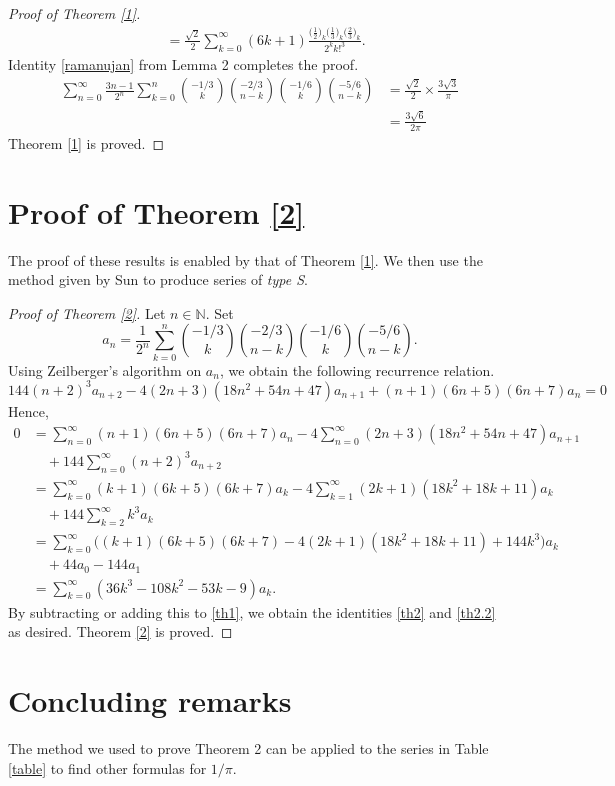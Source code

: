 \documentclass{amsart}
\numberwithin{equation}{section}
\newcommand{\N}{\mathbb N}
\begin{document}
\begin{proof}[Proof of Theorem \ref{1}]
\begin{align*}
        &=\frac{\sqrt{2}}{2}\sum_{k=0}^{\infty}(6k+1)\frac{\bigl(\frac{1}{2}\bigr)_k\bigl(\frac{1}{3}\bigr)_k\bigl(\frac{2}{3}\bigr)_k}{2^kk!^3}.
        \label{2.3}
    \end{align*}
Identity \eqref{ramanujan} from Lemma 2 completes the proof.
 \begin{align*}
     \sum_{n=0}^\infty \frac{3n-1}{2^n}\sum_{k=0}^n\binom{-1/3}{k}\binom{-2/3}{n-k}\binom{-1/6}{k}\binom{-5/6}{n-k}&=\frac{\sqrt{2}}{2}\times\frac{3\sqrt{3}}{\pi}\\&=\frac{3\sqrt{6}}{2\pi}
 \end{align*}
 Theorem \ref{1} is proved.
\end{proof}
\section{Proof of Theorem \ref{2}}
The proof of these results is enabled by that of Theorem \ref{1}. We then use the method given by Sun \cite{newtypeserie} to produce series of \textit{type S}.
\begin{proof}[Proof of Theorem \ref{2}]
Let $n\in\N$. Set
\[
a_n = \frac{1}{2^n} \sum_{k=0}^n \binom{-1/3}{k} \binom{-2/3}{n-k} \binom{-1/6}{k} \binom{-5/6}{n-k}.
\]
Using Zeilberger's algorithm on $a_n$, we obtain the following recurrence relation.
\[144(n+2)^3a_{n+2}-4(2n+3)(18n^2+54n+47)a_{n+1}+(n+1)(6n+5)(6n+7)a_n=0\]
Hence,
\begin{align*}
    0&=\sum_{n=0}^\infty(n+1)(6n+5)(6n+7)a_n-4\sum_{n=0}^\infty(2n+3)(18n^2+54n+47)a_{n+1}\\&\quad+144\sum_{n=0}^\infty(n+2)^3a_{n+2}\\
    &=\sum_{k=0}^\infty(k+1)(6k+5)(6k+7)a_k-4\sum_{k=1}^\infty(2k+1)(18k^2+18k+11)a_k\\&\quad+144\sum_{k=2}^\infty k^3a_k\\
    &=\sum_{k=0}^\infty\bigl((k+1)(6k+5)(6k+7)-4(2k+1)(18k^2+18k+11)+144k^3 \bigr)a_k\\&\quad+44a_0-144a_1\\
    &=\sum_{k=0}^\infty(36k^3-108k^2-53k-9)a_k.
\end{align*}
By subtracting or adding this to \eqref{th1}, we obtain the identities \eqref{th2} and \eqref{th2.2} as desired. Theorem \ref{2} is proved.
\end{proof}
\section{Concluding remarks}
The method we used to prove Theorem 2 can be applied to the series in Table \ref{table} to find other formulas for $1/\pi$.
\end{document}

